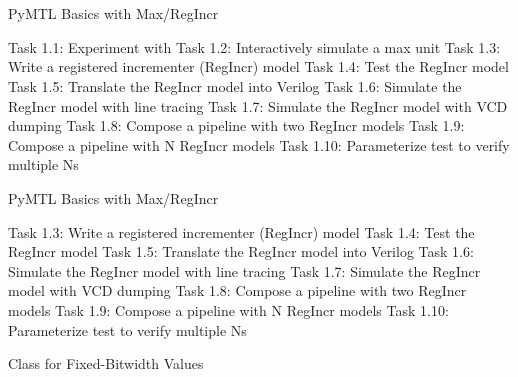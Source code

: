 
\section[{\it Hands-On} Max/RegIncr]{}

\begin{frame}{ PyMTL Basics with Max/RegIncr}
\begin{cbxlist}
  \1 Task 1.1: Experiment with 
  \1 Task 1.2: Interactively simulate a max unit
  \1 Task 1.3: Write a registered incrementer (RegIncr) model
  \1 Task 1.4: Test the RegIncr model
  \1 Task 1.5: Translate the RegIncr model into Verilog
  \1 Task 1.6: Simulate the RegIncr model with line tracing
  \1 Task 1.7: Simulate the RegIncr model with VCD dumping
  \1 Task 1.8: Compose a pipeline with two RegIncr models
  \1 Task 1.9: Compose a pipeline with N RegIncr models
  \1 Task 1.10: Parameterize test to verify multiple Ns
\end{cbxlist}
\end{frame}

\begin{frame}{ PyMTL Basics with Max/RegIncr}
\begin{cbxlist}
  \1 
  \1 
  \1 Task 1.3: Write a registered incrementer (RegIncr) model
  \1 Task 1.4: Test the RegIncr model
  \1 Task 1.5: Translate the RegIncr model into Verilog
  \1 Task 1.6: Simulate the RegIncr model with line tracing
  \1 Task 1.7: Simulate the RegIncr model with VCD dumping
  \1 Task 1.8: Compose a pipeline with two RegIncr models
  \1 Task 1.9: Compose a pipeline with N RegIncr models
  \1 Task 1.10: Parameterize test to verify multiple Ns
\end{cbxlist}
\end{frame}

\begin{frame}[fragile]{ Class for Fixed-Bitwidth Values}
\end{frame}

